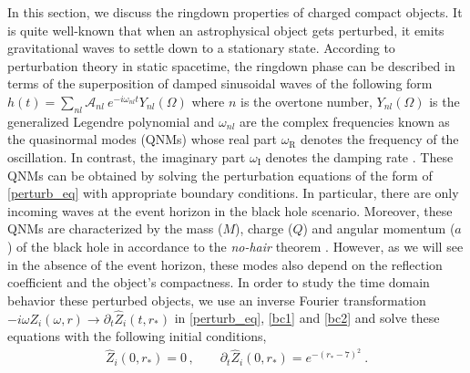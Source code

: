\documentclass[aps,prd,twocolumn,floatfix,noshowpacs,tightenlines,noshowkeys,superscriptaddress,amsmath,amssymb,
nofootinbib]{revtex4-1}
\renewcommand\[{\begin{equation}}
\renewcommand\]{\end{equation}}
\begin{document}
In this section, we discuss the ringdown properties of charged compact objects. It is quite well-known that when an astrophysical object gets perturbed, it emits gravitational waves to settle down to a stationary state. According to perturbation theory in static spacetime, the ringdown phase can be described in terms of the superposition of damped sinusoidal waves of the following form $h(t)=\sum_{nl}\mathcal{A}_{nl}~e^{-i\omega_{nl}t}Y_{nl}(\Omega)$ 
where $n$ is the overtone number, $Y_{nl}(\Omega)$ is the generalized Legendre polynomial and $\omega_{nl}$ are the complex frequencies known as the quasinormal modes (QNMs) whose real part $\omega_{\textrm{R}}$ denotes the frequency of the oscillation. In contrast, the imaginary part $\omega_{\textrm{I}}$ denotes the damping rate \cite{Vishveshwara:1970zz,Chandrasekhar:1975zza,Kokkotas:1999bd,Berti:2009kk}. These QNMs can be obtained by solving the perturbation equations of the form of \autoref{perturb_eq} with appropriate boundary conditions. In particular, there are only incoming waves at the event horizon in the black hole scenario. Moreover, these QNMs are characterized by the mass ($ M $), charge ($ Q $) and angular momentum ($ a $) of the black hole in accordance to the \textit{no-hair} theorem \cite{https://doi.org/10.1002/asna.19752960110,PhysRev.164.1776,PhysRevLett.26.331}. However, as we will see in the absence of the event horizon, these modes also depend on the reflection coefficient and the object's compactness. In order to study the time domain behavior these perturbed objects, we use an inverse Fourier transformation $-i\omega Z_{i}(\omega,r)\to \partial_{t}\hat{Z}_{i}(t,r_{*})$ in \autoref{perturb_eq}, \autoref{bc1} and \autoref{bc2} and solve these equations with the following initial conditions,
\begin{eqnarray}
	\hat{Z}_{i}(0,r_{*})=0\,,\qquad{\partial_{t}\hat{Z}_{i}(0,r_{*})}=e^{-(r_{*}-7)^2}~.
\end{eqnarray}
\end{document}

